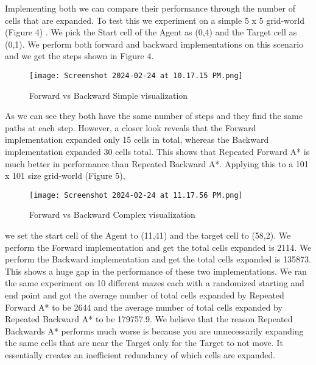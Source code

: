 \documentclass{article}
\begin{document}
Implementing both we can compare their performance through the number of cells that are expanded. To test this we experiment on a simple 5 x 5 grid-world (Figure 4) . We pick the Start cell of the Agent as (0,4) and the Target cell as (0,1). We perform both forward and backward implementations on this scenario and we get the steps shown in Figure 4. \begin{figure}[h]
    \centering
    \texttt{[image: Screenshot 2024-02-24 at 10.17.15 PM.png]}
    \caption{Forward vs Backward Simple visualization}
    \label{fig:example}
\end{figure}As we can see they both have the same number of steps and they find the same paths at each step. However, a closer look reveals that the Forward implementation expanded only 15 cells in total, whereas the Backward implementation expanded 30 cells total. This shows that Repeated Forward A* is much better in performance than Repeated Backward A*. Applying this to a 101 x 101 size grid-world (Figure 5),\begin{figure}[h]
    \centering
    \texttt{[image: Screenshot 2024-02-24 at 11.17.56 PM.png]}
    \caption{Forward vs Backward Complex visualization}
    \label{fig:example}
\end{figure} we set the start cell of the Agent to (11,41) and the target cell to (58,2). We perform the Forward implementation and get the total cells expanded is 2114.  We perform the Backward implementation and get the total cells expanded is 135873. This shows a huge gap in the performance of these two implementations. We ran the same experiment on 10 different mazes each with a randomized starting and end point and got the average number of total cells expanded by Repeated Forward A* to be 2644 and the average number of total cells expanded by Repeated Backward A* to be 179757.9. We believe that the reason Repeated Backwards A* performs much worse is because you are unnecessarily expanding the same cells that are near the Target only for the Target to not move. It essentially creates an inefficient redundancy of which cells are expanded.
\end{document}
